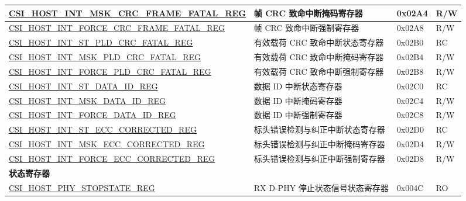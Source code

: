 \begin{longtable}{ | p{8.2cm} | p{6cm} | p{1.2cm} | p{0.8cm} | }
\hyperref[regdesc:CSIHOSTINTMSKCRCFRAMEFATALREG]{CSI\_HOST\_INT\_MSK\_CRC\_FRAME\_FATAL\_REG} & 帧 CRC 致命中断掩码寄存器 & 0x02A4 & R/W \\ \hline
\hyperref[regdesc:CSIHOSTINTFORCECRCFRAMEFATALREG]{CSI\_HOST\_INT\_FORCE\_CRC\_FRAME\_FATAL\_REG} & 帧 CRC 致命中断强制寄存器 & 0x02A8 & R/W \\ \hline
\hyperref[regdesc:CSIHOSTINTSTPLDCRCFATALREG]{CSI\_HOST\_INT\_ST\_PLD\_CRC\_FATAL\_REG} & 有效载荷 CRC 致命中断状态寄存器 & 0x02B0 & RC \\ \hline
\hyperref[regdesc:CSIHOSTINTMSKPLDCRCFATALREG]{CSI\_HOST\_INT\_MSK\_PLD\_CRC\_FATAL\_REG} & 有效载荷 CRC 致命中断掩码寄存器 & 0x02B4 & R/W \\ \hline
\hyperref[regdesc:CSIHOSTINTFORCEPLDCRCFATALREG]{CSI\_HOST\_INT\_FORCE\_PLD\_CRC\_FATAL\_REG} & 有效载荷 CRC 致命中断强制寄存器 & 0x02B8 & R/W \\ \hline
\hyperref[regdesc:CSIHOSTINTSTDATAIDREG]{CSI\_HOST\_INT\_ST\_DATA\_ID\_REG} & 数据 ID 中断状态寄存器 & 0x02C0 & RC \\ \hline
\hyperref[regdesc:CSIHOSTINTMSKDATAIDREG]{CSI\_HOST\_INT\_MSK\_DATA\_ID\_REG} & 数据 ID 中断掩码寄存器 & 0x02C4 & R/W \\ \hline
\hyperref[regdesc:CSIHOSTINTFORCEDATAIDREG]{CSI\_HOST\_INT\_FORCE\_DATA\_ID\_REG} & 数据 ID 中断强制寄存器 & 0x02C8 & R/W \\ \hline
\hyperref[regdesc:CSIHOSTINTSTECCCORRECTEDREG]{CSI\_HOST\_INT\_ST\_ECC\_CORRECTED\_REG} & 标头错误检测与纠正中断状态寄存器 & 0x02D0 & RC \\ \hline
\hyperref[regdesc:CSIHOSTINTMSKECCCORRECTEDREG]{CSI\_HOST\_INT\_MSK\_ECC\_CORRECTED\_REG} & 标头错误检测与纠正中断掩码寄存器 & 0x02D4 & R/W \\ \hline
\hyperref[regdesc:CSIHOSTINTFORCEECCCORRECTEDREG]{CSI\_HOST\_INT\_FORCE\_ECC\_CORRECTED\_REG} & 标头错误检测与纠正中断强制寄存器 & 0x02D8 & R/W \\ \hline
\multicolumn{4}{|l|}{\textbf{状态寄存器}} \\ \hline
\hyperref[regdesc:CSIHOSTPHYSTOPSTATEREG]{CSI\_HOST\_PHY\_STOPSTATE\_REG} & RX D-PHY 停止状态信号状态寄存器 & 0x004C & RO \\ \hline
\end{longtable}
